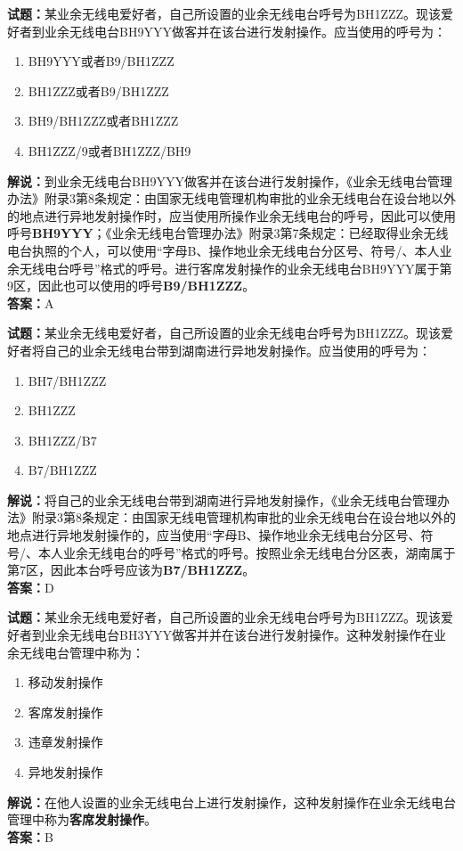 \documentclass{ctexbook}
\begin{document}
\bigskip


\noindent\textbf{试题：}某业余无线电爱好者，自己所设置的业余无线电台呼号为BH1ZZZ。现该爱好者到业余无线电台BH9YYY做客并在该台进行发射操作。应当使用的呼号为：
\begin{enumerate}[leftmargin=3em]
	\item BH9YYY或者B9/BH1ZZZ
	\item BH1ZZZ或者B9/BH1ZZZ
	\item BH9/BH1ZZZ或者BH1ZZZ
	\item BH1ZZZ/9或者BH1ZZZ/BH9
\end{enumerate}
\noindent\textbf{解说：}到业余无线电台BH9YYY做客并在该台进行发射操作，《业余无线电台管理办法》附录3第8条规定：由国家无线电管理机构审批的业余无线电台在设台地以外的地点进行异地发射操作时，应当使用所操作业余无线电台的呼号，因此可以使用呼号\textbf{BH9YYY}；《业余无线电台管理办法》附录3第7条规定：已经取得业余无线电台执照的个人，可以使用“字母B、操作地业余无线电台分区号、符号/、本人业余无线电台呼号”格式的呼号。进行客席发射操作的业余无线电台BH9YYY属于第9区，因此也可以使用的呼号\textbf{B9/BH1ZZZ}。\\\noindent\textbf{答案：}A


\bigskip


\noindent\textbf{试题：}某业余无线电爱好者，自己所设置的业余无线电台呼号为BH1ZZZ。现该爱好者将自己的业余无线电台带到湖南进行异地发射操作。应当使用的呼号为：
\begin{enumerate}[leftmargin=3em]
	\item BH7/BH1ZZZ
	\item BH1ZZZ
	\item BH1ZZZ/B7
	\item B7/BH1ZZZ
\end{enumerate}
\noindent\textbf{解说：}将自己的业余无线电台带到湖南进行异地发射操作，《业余无线电台管理办法》附录3第8条规定：由国家无线电管理机构审批的业余无线电台在设台地以外的地点进行异地发射操作的，应当使用“字母B、操作地业余无线电台分区号、符号/、本人业余无线电台的呼号”格式的呼号。按照业余无线电台分区表，湖南属于第7区，因此本台呼号应该为\textbf{B7/BH1ZZZ}。\\\noindent\textbf{答案：}D



\bigskip


\noindent\textbf{试题：}某业余无线电爱好者，自己所设置的业余无线电台呼号为BH1ZZZ。现该爱好者到业余无线电台BH3YYY做客并并在该台进行发射操作。这种发射操作在业余无线电台管理中称为：
\begin{enumerate}[leftmargin=3em]
	\item 移动发射操作
	\item 客席发射操作
	\item 违章发射操作
	\item 异地发射操作
\end{enumerate}
\noindent\textbf{解说：}在他人设置的业余无线电台上进行发射操作，这种发射操作在业余无线电台管理中称为\textbf{客席发射操作}。\\\noindent\textbf{答案：}B
\end{document}
